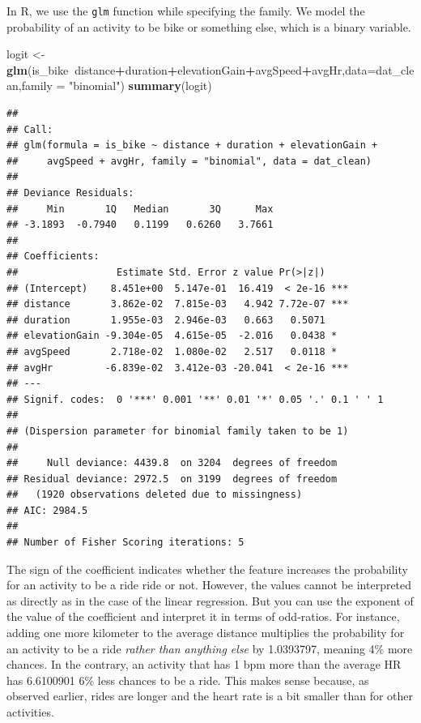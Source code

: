 \documentclass[
]{book}
\newenvironment{Shaded}{\begin{snugshade}}{\end{snugshade}}
\newcommand{\DataTypeTok}[1]{\textcolor[rgb]{0.13,0.29,0.53}{#1}}
\newcommand{\KeywordTok}[1]{\textcolor[rgb]{0.13,0.29,0.53}{\textbf{#1}}}
\newcommand{\NormalTok}[1]{#1}
\newcommand{\OperatorTok}[1]{\textcolor[rgb]{0.81,0.36,0.00}{\textbf{#1}}}
\newcommand{\StringTok}[1]{\textcolor[rgb]{0.31,0.60,0.02}{#1}}
\begin{document}
In R, we use the \texttt{glm} function while specifying the family. We model the probability of an activity to be bike or something else, which is a binary variable.

\begin{Shaded}
\begin{Highlighting}[]
\NormalTok{logit <-}\StringTok{ }\KeywordTok{glm}\NormalTok{(is_bike}\OperatorTok{~}\NormalTok{distance}\OperatorTok{+}\NormalTok{duration}\OperatorTok{+}\NormalTok{elevationGain}\OperatorTok{+}\NormalTok{avgSpeed}\OperatorTok{+}\NormalTok{avgHr,}\DataTypeTok{data=}\NormalTok{dat_clean,}\DataTypeTok{family =} \StringTok{"binomial"}\NormalTok{)}
\KeywordTok{summary}\NormalTok{(logit)}
\end{Highlighting}
\end{Shaded}

\begin{verbatim}
## 
## Call:
## glm(formula = is_bike ~ distance + duration + elevationGain + 
##     avgSpeed + avgHr, family = "binomial", data = dat_clean)
## 
## Deviance Residuals: 
##     Min       1Q   Median       3Q      Max  
## -3.1893  -0.7940   0.1199   0.6260   3.7661  
## 
## Coefficients:
##                 Estimate Std. Error z value Pr(>|z|)    
## (Intercept)    8.451e+00  5.147e-01  16.419  < 2e-16 ***
## distance       3.862e-02  7.815e-03   4.942 7.72e-07 ***
## duration       1.955e-03  2.946e-03   0.663   0.5071    
## elevationGain -9.304e-05  4.615e-05  -2.016   0.0438 *  
## avgSpeed       2.718e-02  1.080e-02   2.517   0.0118 *  
## avgHr         -6.839e-02  3.412e-03 -20.041  < 2e-16 ***
## ---
## Signif. codes:  0 '***' 0.001 '**' 0.01 '*' 0.05 '.' 0.1 ' ' 1
## 
## (Dispersion parameter for binomial family taken to be 1)
## 
##     Null deviance: 4439.8  on 3204  degrees of freedom
## Residual deviance: 2972.5  on 3199  degrees of freedom
##   (1920 observations deleted due to missingness)
## AIC: 2984.5
## 
## Number of Fisher Scoring iterations: 5
\end{verbatim}

The sign of the coefficient indicates whether the feature increases the probability for an activity to be a ride ride or not. However, the values cannot be interpreted as directly as in the case of the linear regression. But you can use the exponent of the value of the coefficient and interpret it in terms of odd-ratios.
For instance, adding one more kilometer to the average distance multiplies the probability for an activity to be a ride \emph{rather than anything else} by 1.0393797, meaning 4\% more chances. In the contrary, an activity that has 1 bpm more than the average HR has 6.6100901 6\% less chances to be a ride. This makes sense because, as observed earlier, rides are longer and the heart rate is a bit smaller than for other activities.
\end{document}

